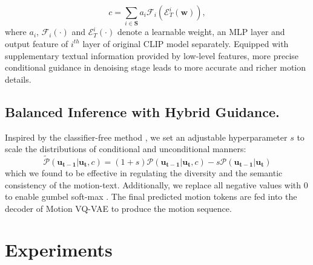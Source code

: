 \documentclass[letterpaper]{article} \usepackage{aaai24}
\begin{document}
\begin{equation}
c=\sum_{i \in \mathcal{\bm{S}}}  a_i \mathcal{F}_i(\mathcal{E}_T^i(\bm{w})),
\end{equation}
where $a_i$, $\mathcal{F}_i(\cdot)$ and $\mathcal{E}_T^i(\cdot)$ denote a learnable weight, an MLP layer and output feature of $i^{th}$ layer of original CLIP model separately. Equipped with supplementary textual information provided by low-level features, more precise conditional guidance in denoising stage leads to more accurate and richer motion details.


\subsection{Balanced Inference with Hybrid Guidance.}
Inspired by the classifier-free method \cite{ho2022classifierfree}, we set an adjustable hyperparameter $s$ to scale the distributions of conditional and unconditional manners:
\begin{equation}
    \widetilde{\mathcal{P}}(\bm{u_{t-1}}|\bm{u_{t}},c) = (1+s){\mathcal{P}}(\bm{u_{t-1}}|\bm{u_{t}},c)-s{\mathcal{P}}(\bm{u_{t-1}}|\bm{u_{t}})
\end{equation}
which we found to be effective in regulating the diversity and the semantic consistency of the motion-text. Additionally, we replace all negative values 
with 0 to enable gumbel soft-max \cite{jang2017categorical}. The final predicted motion tokens are fed into the decoder of Motion VQ-VAE to produce the motion sequence.








































\section{Experiments}
\end{document}
